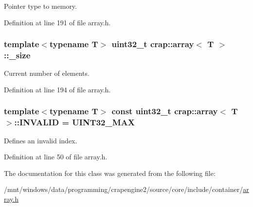 Pointer type to memory. 



Definition at line 191 of file array.\+h.

\hypertarget{classcrap_1_1array_aeebbf4b3828375ad799bb6f3638b5a3f}{
\subsubsection[{\+\_\+size}]{\setlength{\rightskip}{0pt plus 5cm}template$<$typename T$>$ uint32\+\_\+t {\bf crap\+::array}$<$ T $>$\+::\+\_\+size\hspace{0.3cm}{\ttfamily [protected]}}}\label{classcrap_1_1array_aeebbf4b3828375ad799bb6f3638b5a3f}


Current number of elements. 



Definition at line 194 of file array.\+h.

\hypertarget{classcrap_1_1array_a9ad63bb5c848f0ba7ebef098a8b3a6ab}{
\subsubsection[{I\+N\+V\+A\+L\+I\+D}]{\setlength{\rightskip}{0pt plus 5cm}template$<$typename T$>$ const uint32\+\_\+t {\bf crap\+::array}$<$ T $>$\+::I\+N\+V\+A\+L\+I\+D = {\bf U\+I\+N\+T32\+\_\+\+M\+A\+X}\hspace{0.3cm}{\ttfamily [static]}}}\label{classcrap_1_1array_a9ad63bb5c848f0ba7ebef098a8b3a6ab}


Defines an invalid index. 



Definition at line 50 of file array.\+h.



The documentation for this class was generated from the following file\+:\begin{DoxyCompactItemize}
\item 
/mnt/windows/data/programming/crapengine2/source/core/include/container/\hyperlink{array_8h}{array.\+h}\end{DoxyCompactItemize}
